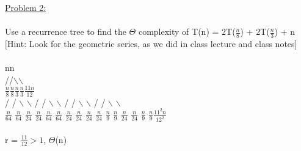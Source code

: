 \documentclass{article}
\begin{document}
    \underline{Problem 2:}\\\\
    Use a recurrence tree to find the $\Theta$ complexity of T(n) = 2T($\frac{n}{8}$) + 2T($\frac{n}{3}$) + n\\
    $[$Hint: Look for the geometric series, as we did in class lecture and class notes$]$\\
    \\
    \indent\indent\hspace{3.2cm}n\hspace{4.5cm}n\\
    \indent\hspace{24pt}/\hspace{52pt}/\hspace{45pt}$\backslash$\hspace{40pt}$\backslash$\\
    \indent\hspace{21pt}$\frac{n}{8}$\hspace{49pt}$\frac{n}{8}$\hspace{48pt}$\frac{n}{3}$\hspace{39pt}$\frac{n}{3}$\hspace{50pt}$\frac{11n}{12}$\\
    \indent\hspace{1pt} / \hspace{1pt} / \hspace{1pt}$\backslash$ \hspace{1pt} $\backslash$ \hspace{13pt}/ \hspace{1pt} / \hspace{1pt}$\backslash$ \hspace{1pt} $\backslash$ \hspace{13pt}/ \hspace{1pt} / $\backslash$ $\backslash$ \hspace{5pt} / \hspace{2pt} / $\backslash$ $\backslash$ \\
    \indent $\frac{n}{64}$ $\frac{n}{64}$ $\frac{n}{24}$ $\frac{n}{24}$ $\frac{n}{64}$ $\frac{n}{64}$ $\frac{n}{24}$ $\frac{n}{24}$ $\frac{n}{24}$ $\frac{n}{24}$ $\frac{n}{9}$ $\frac{n}{9}$ $\frac{n}{24}$ $\frac{n}{24}$ $\frac{n}{9}$ $\frac{n}{9}$\hspace{32pt}$\frac{11^2n}{12^2}$\\\\
    \indent r = $\frac{11}{12} > 1$, $\Theta$(n)\\
    \\
\end{document}
